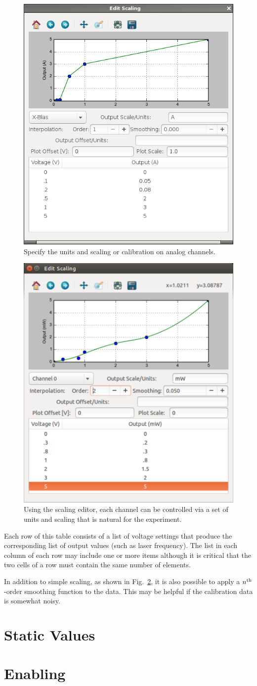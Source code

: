 \begin{figure}[ht]
  \centerline{\includegraphics[width=.5\textwidth]{figures/scaling-v0}}
  \caption{Specify the units and scaling or calibration on analog
  channels.}
  \label{fig:channel:scaling-v0}
\end{figure}


\begin{figure}[hb]
  \centerline{\includegraphics[width=.5\textwidth]{figures/scaling}}
  \caption{
    Using the scaling editor, each channel can be controlled via a set of units
    and scaling that is natural for the experiment.
  }
  \label{fig:channel:scaling}
\end{figure}

Each row of this table consists of a list of voltage settings that produce the
corresponding list of output values (such as laser frequency).  The list in each
column of each row may include one or more items although it is critical that
the two cells of a row must contain the same number of elements.

In addition to simple scaling, as shown in Fig.~\ref{fig:channel:scaling}, it is
also possible to apply a $n^{\rm th}$-order smoothing function to the data.
This may be helpful if the calibration data is somewhat noisy.

\section{Static Values}
\section{Enabling}
